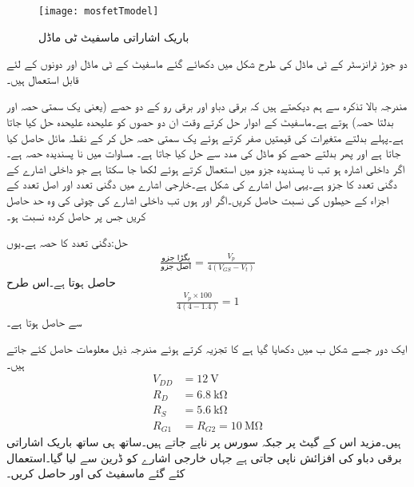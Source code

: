 %
\begin{figure}
\centering
\texttt{[image: mosfetTmodel]}
\caption{باریک اشاراتی ماسفیٹ ٹی ماڈل}
\label{شکل_ماسفیٹ_ٹی_ماڈل}
\end{figure}

دو جوڑ ٹرانزسٹر کے ٹی ماڈل کی طرح  شکل  میں دکھائے گئے ماسفیٹ کے ٹی ماڈل  اور  دونوں کے لئے قابل استعمال ہیں۔
 

مندرجہ بالا تذکرہ سے ہم دیکھتے ہیں کہ برقی دباو اور برقی رو کے دو حصے (یعنی یک سمتی حصہ اور بدلتا حصہ) ہوتے ہے۔ماسفیٹ کے ادوار حل کرتے وقت ان دو حصوں کو علیحدہ علیحدہ حل کیا جاتا ہے۔پہلے بدلتے متغیرات کی قیمتیں صفر کرتے ہوئے یک سمتی حصہ حل کر کے نقطہ مائل حاصل کیا جاتا ہے اور پھر بدلتے حصے کو ماڈل کی مدد سے حل کیا جاتا ہے۔
مساوات  میں  نا پسندیدہ حصہ ہے۔اگر داخلی اشارہ  ہو تب نا پسندیدہ جزو میں  استعمال کرتے ہوئے   لکھا جا سکتا ہے جو داخلی اشارے کے دگنی تعدد کا جزو  ہے۔یہی اصل اشارے کی شکل  ہے۔خارجی اشارے میں دگنی تعدد اور اصل تعدد کے اجزاء کے حیطوں کی نسبت حاصل کریں۔اگر  اور  ہوں تب داخلی اشارے کی چوٹی کی وہ حد حاصل کریں جس پر حاصل کردہ نسبت  ہو۔

حل:دگنی تعدد کا حصہ  ہے۔یوں
\begin{align*}
\frac{\textrm{بگڑا جزو}}{\textrm{اصل جزو}}=\frac{V_p}{4 \left(V_{GS}-V_t \right)}
\end{align*}
حاصل ہوتا ہے۔اس طرح
\begin{align*}
\frac{V_p \times 100}{4 \left(4-1.4\right)}=1
\end{align*}
سے   حاصل ہوتا ہے۔

ایک دور جسے شکل  ب میں دکھایا گیا ہے کا تجزیہ کرتے ہوئے مندرجہ ذیل معلومات حاصل کئے جاتے ہیں۔
\begin{align*}
V_{DD}&=\SI{12}{\volt}\\
R_D&=\SI{6.8}{\kilo \ohm}\\
R_S&=\SI{5.6}{\kilo \ohm}\\
R_{G1}&=R_{G2}=\SI{10}{\mega \ohm}
\end{align*}
ہیں۔مزید اس کے گیٹ پر  جبکہ سورس پر  ناپے جاتے ہیں۔ساتھ ہی ساتھ باریک اشاراتی برقی دباو کی افزائش  ناپی جاتی ہے جہاں خارجی اشارے کو ڈرین سے لیا گیا۔استعمال کئے گئے ماسفیٹ کی  اور  حاصل کریں۔

